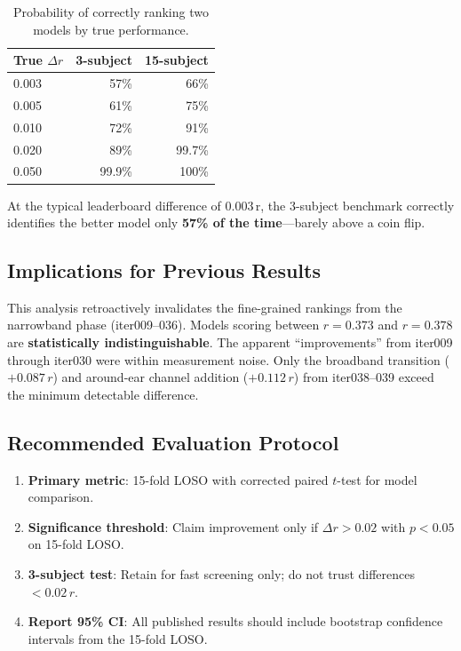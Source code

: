 \documentclass[11pt,a4paper]{article}
\begin{document}
\begin{table}[H]
\centering
\caption{Probability of correctly ranking two models by true performance.}
\begin{tabular}{lrr}
\toprule
True $\Delta r$ & 3-subject & 15-subject \\
\midrule
0.003 & 57\% & 66\% \\
0.005 & 61\% & 75\% \\
0.010 & 72\% & 91\% \\
0.020 & 89\% & 99.7\% \\
0.050 & 99.9\% & 100\% \\
\bottomrule
\end{tabular}
\end{table}

At the typical leaderboard difference of 0.003\,r, the 3-subject
benchmark correctly identifies the better model only \textbf{57\% of the
time}---barely above a coin flip.

\subsection{Implications for Previous Results}

This analysis retroactively invalidates the fine-grained rankings from the
narrowband phase (iter009--036). Models scoring between $r = 0.373$ and
$r = 0.378$ are \textbf{statistically indistinguishable}. The apparent
``improvements'' from iter009 through iter030 were within measurement
noise. Only the broadband transition ($+0.087\,r$) and around-ear channel
addition ($+0.112\,r$) from iter038--039 exceed the minimum detectable
difference.

\subsection{Recommended Evaluation Protocol}

\begin{enumerate}
  \item \textbf{Primary metric}: 15-fold LOSO with corrected paired
    $t$-test for model comparison.
  \item \textbf{Significance threshold}: Claim improvement only if
    $\Delta r > 0.02$ with $p < 0.05$ on 15-fold LOSO.
  \item \textbf{3-subject test}: Retain for fast screening only; do not
    trust differences $< 0.02\,r$.
  \item \textbf{Report 95\% CI}: All published results should include
    bootstrap confidence intervals from the 15-fold LOSO.
\end{enumerate}
\end{document}
